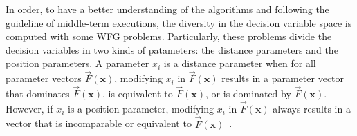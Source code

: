 In order, to have a better understanding of the algorithms and following the guideline of middle-term executions, the diversity in the decision variable space is computed with some WFG problems.
%
Particularly, these problems divide the decision variables in two kinds of patameters: the distance parameters and the position parameters.
%
A parameter $x_i$ is a distance parameter when for all parameter vectors $\vec{F}(\mathbf{x})$, modifying $x_i$ in $\vec{F}(\mathbf{x})$ results in a parameter vector that dominates $\vec{F}(\mathbf{x})$, is equivalent to $\vec{F}(\mathbf{x})$, or is dominated by $\vec{F}(\mathbf{x})$.
%
However, if $x_i$ is a position parameter, modifying $x_i$ in $\vec{F}(\mathbf{x})$ always results in a vector that is incomparable or equivalent to $\vec{F}(\mathbf{x})$~\cite{huband2005scalable}.
%

